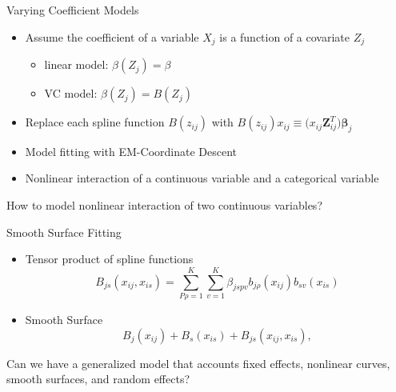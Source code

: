 \documentclass[
  ignorenonframetext,
  aspectratio=169]{beamer}
\providecommand{\tightlist}{%
  \setlength{\itemsep}{0pt}\setlength{\parskip}{0pt}}
\newcommand{\bs}[1]{\boldsymbol{#1}}
\begin{document}
\begin{frame}{Varying Coefficient Models}
\protect\hypertarget{varying-coefficient-models}{}
\begin{itemize}
\tightlist
\item
  Assume the coefficient of a variable \(X_j\) is a function of a
  covariate \(Z_j\)

  \begin{itemize}
  \tightlist
  \item
    linear model: \(\beta(Z_j) = \beta\)
  \item
    VC model: \(\beta(Z_j) = B(Z_j)\)
  \end{itemize}
\item
  Replace each spline function \(B(z_{ij})\) with
  \(B(z_{ij})x_{ij}\equiv \bs (x_{ij}\bs Z_{ij}^T)\bs \beta_j\)
\item
  Model fitting with EM-Coordinate Descent
\item
  Nonlinear interaction of a continuous variable and a categorical
  variable
\end{itemize}

\begin{tcolorbox}[colback=green!5,colframe=green!40!black,title=Question]
  How to model nonlinear interaction of two continuous variables?
\end{tcolorbox}
\end{frame}

\begin{frame}{Smooth Surface Fitting}
\protect\hypertarget{smooth-surface-fitting}{}
\begin{itemize}
\tightlist
\item
  Tensor product of spline functions \[
  B_{js}(x_{ij}, x_{is}) = \sum\limits^K_{P\rho=1} \sum\limits^K_{v=1} \beta_{jspv} b_{j\rho}(x_{ij})b_{sv}(x_{is})
  \]
\item
  Smooth Surface \[
    B_j(x_{ij}) + B_s(x_{is}) + B_{js}(x_{ij}, x_{is}),
  \]
\end{itemize}

\begin{tcolorbox}[colback=green!5,colframe=green!40!black,title=Question]
  Can we have a generalized model that accounts fixed effects, nonlinear curves, smooth surfaces, and random effects?
\end{tcolorbox}
\end{frame}
\end{document}
